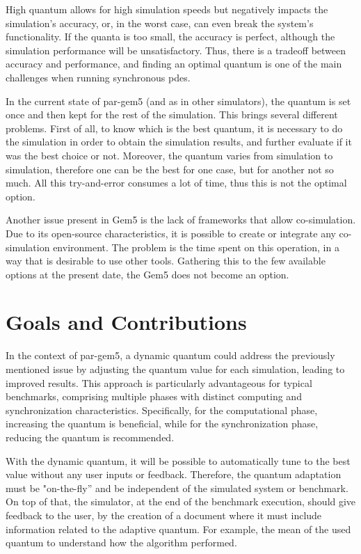 High quantum allows for high simulation speeds but negatively impacts the simulation's accuracy, or, in the worst case, can even break the system's 
functionality. If the quanta is too small, the accuracy is perfect, although the simulation performance will be unsatisfactory. Thus, there is a 
tradeoff between accuracy and performance, and finding an optimal quantum is one of the main challenges when running synchronous \gls{pdes}.

In the current state of par-gem5 (and as in other simulators), the quantum is set once and then kept for the rest of the simulation. This brings 
several different problems. First of all, to know which is the best quantum, it is necessary to do the simulation in order to obtain the simulation 
results, and further evaluate if it was the best choice or not. Moreover, the quantum varies from simulation to simulation, therefore one can be the 
best for one case, but for another not so much. All this try-and-error consumes a lot of time, thus this is not the optimal option. 

Another issue present in Gem5 is the lack of frameworks that allow co-simulation. Due to its open-source characteristics, it is possible to 
create or integrate any co-simulation environment. The problem is the time spent on this operation, in a way that is desirable to use other 
tools. Gathering this to the few available options at the present date, the Gem5 does not become an option.

\section{Goals and Contributions}

In the context of par-gem5, a dynamic quantum could address the previously mentioned issue by adjusting the quantum value for each simulation, 
leading to improved results. 
This approach is particularly advantageous for typical benchmarks, comprising multiple phases with distinct computing and synchronization 
characteristics. Specifically, for the computational phase, increasing the quantum is beneficial, while for the synchronization phase, 
reducing the quantum is recommended.

With the dynamic quantum, it will be possible to automatically tune to the best value without any user inputs or feedback. 
Therefore, the quantum adaptation must be "on-the-fly” and be independent of the simulated system or benchmark. 
On top of that, the simulator, at the end of the benchmark execution, should give feedback to the user, by the creation of a 
document where it must include information related to the adaptive quantum. For example, the mean of the used quantum to understand how 
the algorithm performed.

